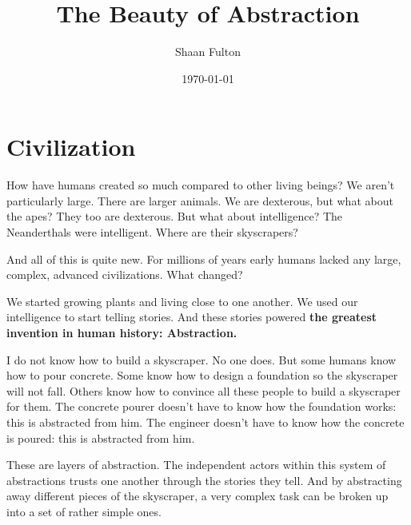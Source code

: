 \documentclass[12pt]{article}
\title{The Beauty of Abstraction}
\author{Shaan Fulton}
\date{\today}
\begin{document}
\maketitle

\section*{Civilization}

How have humans created so much compared to other living beings? We aren't particularly large. There are larger animals. We are dexterous, but what about the apes? They too are dexterous. But what about intelligence? The Neanderthals were intelligent. Where are their skyscrapers?

And all of this is quite new. For millions of years early humans lacked any large, complex, advanced civilizations. What changed?

We started growing plants and living close to one another. We used our intelligence to start telling stories. And these stories powered \textbf{the greatest invention in human history: Abstraction.}

\begin{center}
\end{center}

I do not know how to build a skyscraper. No one does. But some humans know how to pour concrete. Some know how to design a foundation so the skyscraper will not fall. Others know how to convince all these people to build a skyscraper for them. The concrete pourer doesn't have to know how the foundation works: this is abstracted from him. The engineer doesn't have to know how the concrete is poured: this is abstracted from him.

These are layers of abstraction. The independent actors within this system of abstractions trusts one another through the stories they tell. And by abstracting away different pieces of the skyscraper, a very complex task can be broken up into a set of rather simple ones.
\end{document}
